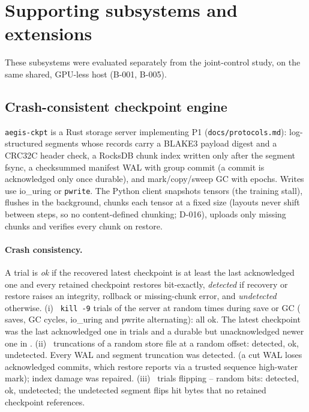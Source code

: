 \section{Supporting subsystems and extensions}
\label{sec:ext}

These subsystems were evaluated separately from the joint-control study, on the same shared, GPU-less
host (B-001, B-005).

\subsection{Crash-consistent checkpoint engine}
\label{sec:ext-ckpt}

\texttt{aegis-ckpt} is a Rust storage server implementing P1 (\texttt{docs/protocols.md}): log-structured
segments whose records carry a BLAKE3 payload digest and a CRC32C header check, a RocksDB chunk index
written only after the segment fsync, a checksummed manifest WAL with group commit (a commit is acknowledged
only once durable), and mark/copy/sweep GC with epochs. Writes use io\_uring or \texttt{pwrite}. The Python
client snapshots tensors (the training stall), flushes in the background, chunks each tensor at a fixed
size (layouts never shift between steps, so no content-defined chunking; D-016), uploads only missing
chunks and verifies every chunk on restore.

\paragraph{Crash consistency.} A trial is \emph{ok} if the recovered latest checkpoint is at least the last
acknowledged one and every retained checkpoint restores bit-exactly, \emph{detected} if recovery or restore
raises an integrity, rollback or missing-chunk error, and \emph{undetected} otherwise.
(i)~\CckptKillTrials{} \texttt{kill -9} trials of the server at random times during save or GC
(\CckptKillSaves{} saves, \CckptKillGcs{} GC cycles, io\_uring and pwrite alternating): all
\CckptKillOk{} ok. The latest checkpoint was the last acknowledged one in \CckptKillLatestAcked{} trials
and a durable but unacknowledged newer one in \CckptKillLatestUnacked.
(ii)~\CckptTornTrials{} truncations of a random store file at a random offset: \CckptTornDetected{}
detected, \CckptTornOk{} ok, \CckptTornUndetected{} undetected. Every WAL and segment truncation was
detected. (a cut WAL loses acknowledged commits, which restore reports via a trusted sequence
high-water mark); index damage was repaired.
(iii)~\CckptFlipTrials{} trials flipping -- random bits: \CckptFlipDetected{} detected,
\CckptFlipOk{} ok, \CckptFlipUndetected{} undetected; the \CckptFlipSegmentOk{} undetected segment flips
hit bytes that no retained checkpoint references.

